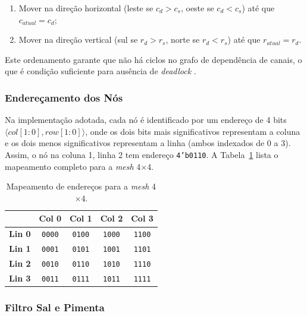 \documentclass[12pt, a4paper]{article}
\begin{document}
	\begin{enumerate}
		\item Mover na direção horizontal (leste se $c_d > c_s$, oeste se
		$c_d < c_s$) até que $c_{atual} = c_d$;
		\item Mover na direção vertical (sul se $r_d > r_s$, norte se
		$r_d < r_s$) até que $r_{atual} = r_d$.
	\end{enumerate}
	
	Este ordenamento garante que não há ciclos no grafo de dependência de canais,
	o que é condição suficiente para ausência de \textit{deadlock} \cite{dally}.
	
	\subsubsection{Endereçamento dos Nós}
	
	Na implementação adotada, cada nó é identificado por um endereço de 4 bits
	$\langle col[1:0], row[1:0] \rangle$, onde os dois bits mais significativos
	representam a coluna e os dois menos significativos representam a linha (ambos
	indexados de 0 a 3). Assim, o nó na coluna 1, linha 2 tem endereço
	\texttt{4'b0110}. A Tabela~\ref{tab:enderecos} lista o mapeamento completo
	para a \textit{mesh} 4$\times$4.
	
	\begin{table}[H]
		\centering
		\caption{Mapeamento de endereços para a \textit{mesh} 4$\times$4.}
		\label{tab:enderecos}
		\begin{tabular}{ccccc}
			\toprule
			& \textbf{Col 0} & \textbf{Col 1} & \textbf{Col 2} & \textbf{Col 3} \\
			\midrule
			\textbf{Lin 0} & \texttt{0000} & \texttt{0100} & \texttt{1000} & \texttt{1100} \\
			\textbf{Lin 1} & \texttt{0001} & \texttt{0101} & \texttt{1001} & \texttt{1101} \\
			\textbf{Lin 2} & \texttt{0010} & \texttt{0110} & \texttt{1010} & \texttt{1110} \\
			\textbf{Lin 3} & \texttt{0011} & \texttt{0111} & \texttt{1011} & \texttt{1111} \\
			\bottomrule
		\end{tabular}
	\end{table}
	
	\subsubsection{Filtro Sal e Pimenta}
	
\end{document}
